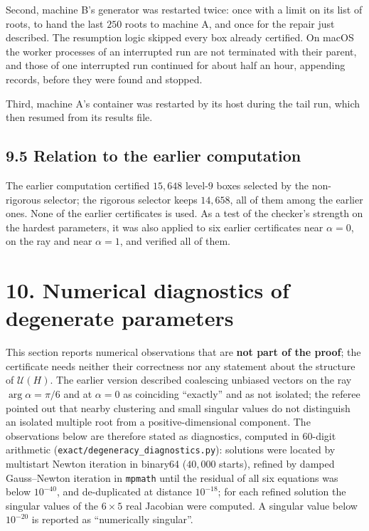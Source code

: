 \documentclass[
  11pt,
]{article}
\begin{document}
Second, machine B's generator was restarted twice: once with a limit on
its list of roots, to hand the last \(250\) roots to machine A, and once
for the repair just described. The resumption logic skipped every box
already certified. On macOS the worker processes of an interrupted run
are not terminated with their parent, and those of one interrupted run
continued for about half an hour, appending records, before they were
found and stopped.

Third, machine A's container was restarted by its host during the tail
run, which then resumed from its results file.

\subsection{9.5 Relation to the earlier
computation}\label{relation-to-the-earlier-computation}

The earlier computation certified \(15{,}648\) level-\(9\) boxes
selected by the non-rigorous selector; the rigorous selector keeps
\(14{,}658\), all of them among the earlier ones. None of the earlier
certificates is used. As a test of the checker's strength on the hardest
parameters, it was also applied to six earlier certificates near
\(\alpha=0\), on the ray and near \(\alpha=1\), and verified all of
them.

\section{10. Numerical diagnostics of degenerate
parameters}\label{numerical-diagnostics-of-degenerate-parameters}

This section reports numerical observations that are \textbf{not part of
the proof}; the certificate needs neither their correctness nor any
statement about the structure of \(\mathcal U(H)\). The earlier version
described coalescing unbiased vectors on the ray \(\arg\alpha=\pi/6\)
and at \(\alpha=0\) as coinciding ``exactly'' and as not isolated; the
referee pointed out that nearby clustering and small singular values do
not distinguish an isolated multiple root from a positive-dimensional
component. The observations below are therefore stated as diagnostics,
computed in \(60\)-digit arithmetic
(\texttt{exact/degeneracy\_diagnostics.py}): solutions were located by
multistart Newton iteration in binary64 (\(40{,}000\) starts), refined
by damped Gauss--Newton iteration in \texttt{mpmath} until the residual
of all six equations was below \(10^{-40}\), and de-duplicated at
distance \(10^{-18}\); for each refined solution the singular values of
the \(6\times5\) real Jacobian were computed. A singular value below
\(10^{-20}\) is reported as ``numerically singular''.
\end{document}
